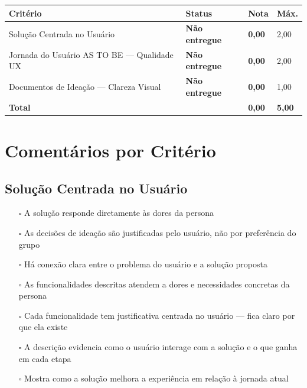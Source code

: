 \documentclass[
  sigconf,
  nonacm, %
  language=portuguese
]{acmart}
\newcommand{\statuswarn}[1]{{\small\bfseries\color{cwarn}#1}}
\begin{document}
\begin{tabular}{@{} L{2.6cm} C{2.5cm} C{1.1cm} C{1.1cm} @{}}
\toprule
\textbf{Critério} & \textbf{Status} & \textbf{Nota} & \textbf{Máx.} \\
\midrule
Solução Centrada no Usuário & \statuswarn{Não entregue} & \textbf{0,00} & 2,00 \\
Jornada do Usuário AS TO BE — Qualidade UX & \statuswarn{Não entregue} & \textbf{0,00} & 2,00 \\
Documentos de Ideação — Clareza Visual & \statuswarn{Não entregue} & \textbf{0,00} & 1,00 \\
\midrule
\textbf{Total} & & \textbf{\color{cred}0,00} & \textbf{5,00} \\
\bottomrule
\end{tabular}

\section{Comentários por Critério}

\subsection{Solução Centrada no Usuário}

\noindent\statuswarn{0,00\,/\,2,00 pts · Não entregue}

\begin{itemize}[leftmargin=14pt,itemsep=1pt,topsep=3pt,parsep=0pt]
  \item[$\square$] {\small\textcolor{cmuted}{A solução responde diretamente às dores da persona}}
  \item[$\square$] {\small\textcolor{cmuted}{As decisões de ideação são justificadas pelo usuário, não por preferência do grupo}}
  \item[$\square$] {\small\textcolor{cmuted}{Há conexão clara entre o problema do usuário e a solução proposta}}
  \item[$\square$] {\small\textcolor{cmuted}{As funcionalidades descritas atendem a dores e necessidades concretas da persona}}
  \item[$\square$] {\small\textcolor{cmuted}{Cada funcionalidade tem justificativa centrada no usuário — fica claro por que ela existe}}
  \item[$\square$] {\small\textcolor{cmuted}{A descrição evidencia como o usuário interage com a solução e o que ganha em cada etapa}}
  \item[$\square$] {\small\textcolor{cmuted}{Mostra como a solução melhora a experiência em relação à jornada atual}}
\end{itemize}
\end{document}
